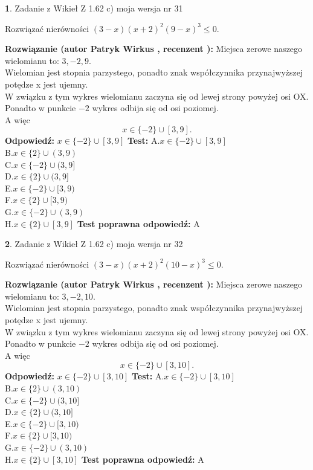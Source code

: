 \documentclass[12pt, a4paper]{article}
\theoremstyle{definition} %
\newtheorem{zad}{}
\newcommand{\zadStart}[1]{\begin{zad}#1\newline}
\newcommand{\zadStop}{\end{zad}}
\newcommand{\rozwStart}[2]{\noindent \textbf{Rozwiązanie (autor #1 , recenzent #2): }\newline}
\newcommand{\rozwStop}{\newline}
\newcommand{\odpStart}{\noindent \textbf{Odpowiedź:}\newline}
\newcommand{\odpStop}{\newline}
\newcommand{\testStart}{\noindent \textbf{Test:}\newline}
\newcommand{\testStop}{\newline}
\newcommand{\kluczStart}{\noindent \textbf{Test poprawna odpowiedź:}\newline}
\newcommand{\kluczStop}{\newline}
\begin{document}
\zadStart{Zadanie z Wikieł Z 1.62 c) moja wersja nr 31}

Rozwiązać nierówności $(3-x)(x+2)^{2}(9-x)^{3}\le0$.
\zadStop
\rozwStart{Patryk Wirkus}{}
Miejsca zerowe naszego wielomianu to: $3, -2, 9$.\\
Wielomian jest stopnia parzystego, ponadto znak współczynnika przy\linebreak najwyższej potędze x jest ujemny.\\ W związku z tym wykres wielomianu zaczyna się od lewej strony powyżej osi OX.\\
Ponadto w punkcie $-2$ wykres odbija się od osi poziomej.\\
A więc $$x \in \{-2\} \cup [3,9].$$
\rozwStop
\odpStart
$x \in \{-2\} \cup [3,9]$
\odpStop
\testStart
A.$x \in \{-2\} \cup [3,9]$\\
B.$x \in \{2\} \cup (3,9)$\\
C.$x \in \{-2\} \cup (3,9]$\\
D.$x \in \{2\} \cup (3,9]$\\
E.$x \in \{-2\} \cup [3,9)$\\
F.$x \in \{2\} \cup [3,9)$\\
G.$x \in \{-2\} \cup (3,9)$\\
H.$x \in \{2\} \cup [3,9]$
\testStop
\kluczStart
A
\kluczStop



\zadStart{Zadanie z Wikieł Z 1.62 c) moja wersja nr 32}

Rozwiązać nierówności $(3-x)(x+2)^{2}(10-x)^{3}\le0$.
\zadStop
\rozwStart{Patryk Wirkus}{}
Miejsca zerowe naszego wielomianu to: $3, -2, 10$.\\
Wielomian jest stopnia parzystego, ponadto znak współczynnika przy\linebreak najwyższej potędze x jest ujemny.\\ W związku z tym wykres wielomianu zaczyna się od lewej strony powyżej osi OX.\\
Ponadto w punkcie $-2$ wykres odbija się od osi poziomej.\\
A więc $$x \in \{-2\} \cup [3,10].$$
\rozwStop
\odpStart
$x \in \{-2\} \cup [3,10]$
\odpStop
\testStart
A.$x \in \{-2\} \cup [3,10]$\\
B.$x \in \{2\} \cup (3,10)$\\
C.$x \in \{-2\} \cup (3,10]$\\
D.$x \in \{2\} \cup (3,10]$\\
E.$x \in \{-2\} \cup [3,10)$\\
F.$x \in \{2\} \cup [3,10)$\\
G.$x \in \{-2\} \cup (3,10)$\\
H.$x \in \{2\} \cup [3,10]$
\testStop
\kluczStart
A
\kluczStop
\end{document}
